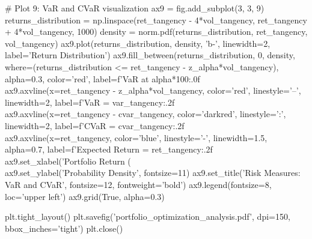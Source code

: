 \documentclass[a4paper, 11pt]{article}
\begin{document}
\begin{pycode}
# Plot 9: VaR and CVaR visualization
ax9 = fig.add_subplot(3, 3, 9)
returns_distribution = np.linspace(ret_tangency - 4*vol_tangency,
                                   ret_tangency + 4*vol_tangency, 1000)
density = norm.pdf(returns_distribution, ret_tangency, vol_tangency)
ax9.plot(returns_distribution, density, 'b-', linewidth=2, label='Return Distribution')
ax9.fill_between(returns_distribution, 0, density,
                 where=(returns_distribution <= ret_tangency - z_alpha*vol_tangency),
                 alpha=0.3, color='red', label=f'VaR at {alpha*100:.0f}\\%
ax9.axvline(x=ret_tangency - z_alpha*vol_tangency, color='red', linestyle='--',
           linewidth=2, label=f'VaR = {var_tangency:.2f}\\%
ax9.axvline(x=ret_tangency - cvar_tangency, color='darkred', linestyle=':',
           linewidth=2, label=f'CVaR = {cvar_tangency:.2f}\\%
ax9.axvline(x=ret_tangency, color='blue', linestyle='-', linewidth=1.5, alpha=0.7,
           label=f'Expected Return = {ret_tangency:.2f}\\%
ax9.set_xlabel('Portfolio Return (\\%
ax9.set_ylabel('Probability Density', fontsize=11)
ax9.set_title('Risk Measures: VaR and CVaR', fontsize=12, fontweight='bold')
ax9.legend(fontsize=8, loc='upper left')
ax9.grid(True, alpha=0.3)

plt.tight_layout()
plt.savefig('portfolio_optimization_analysis.pdf', dpi=150, bbox_inches='tight')
plt.close()
\end{pycode}
\end{document}
